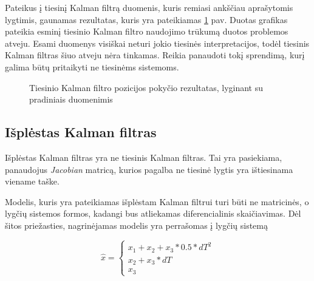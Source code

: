 Pateikus į tiesinį Kalman filtrą duomenis, kuris remiasi ankščiau aprašytomis lygtimis, gaunamas rezultatas, kuris yra pateikiamas \ref{fig:linear_kalman_filter_sin} pav.
Duotas grafikas pateikia esminį tiesinio Kalman filtro naudojimo trūkumą duotos problemos atveju.
Esami duomenys visiškai neturi jokio tiesinės interpretacijos, todėl tiesinis Kalman filtras šiuo atveju nėra tinkamas.
Reikia panaudoti tokį sprendimą, kurį galima būtų pritaikyti ne tiesinėms sistemoms.

\begin{figure}
    \centering
    \caption{Tiesinio Kalman filtro pozicijos pokyčio rezultatas, lyginant su pradiniais duomenimis}
    \label{fig:linear_kalman_filter_sin}
\end{figure}

\subsection{Išplėstas Kalman filtras}

Išplėstas Kalman filtras yra ne tiesinis Kalman filtras.
Tai yra pasiekiama, panaudojus \textit{Jacobian} matricą, kurios pagalba ne tiesinė lygtis yra ištiesinama viename taške.

Modelis, kuris yra pateikiamas išplėstam Kalman filtrui turi būti ne matricinės, o lygčių sistemos formos, kadangi bus atliekamas diferencialinis skaičiavimas.
Dėl šitos priežasties, nagrinėjamas modelis yra perrašomas į lygčių sistemą

\begin{equation}
    \hat{x} = \begin{cases}
        x_1 + x_2 + x_3 * 0.5 * dT^2 \\
        x_2 + x_3 * dT \\
        x_3
    \end{cases}
\end{equation}

